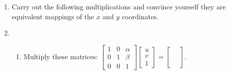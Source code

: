 \documentclass[../textbook.tex]{subfiles}
\begin{document}
\begin{enumerate}
\setcounter{enumi}{\value{problem_i}}
\item Carry out the following multiplications and convince yourself they are equivalent mappings of the $x$ and $y$ coordinates.
\begin{enumerate}
\end{enumerate}
\item \begin{enumerate}
\item Multiply these matrices: $\left[\begin{array}{ccc} 1 & 0 & \alpha \\ 0 & 1 & \beta \\ 0 & 0 & 1 \end{array}\right]\left[\begin{array}{c}u \\ v \\ 1 \end{array}\right]=\left[\begin{array}{c}\phantom{u} \\ \phantom{v} \\ \phantom{1}\end{array}\right].$ \label{prob:translation_matrix}

\end{enumerate}
\end{enumerate}
\end{document}
